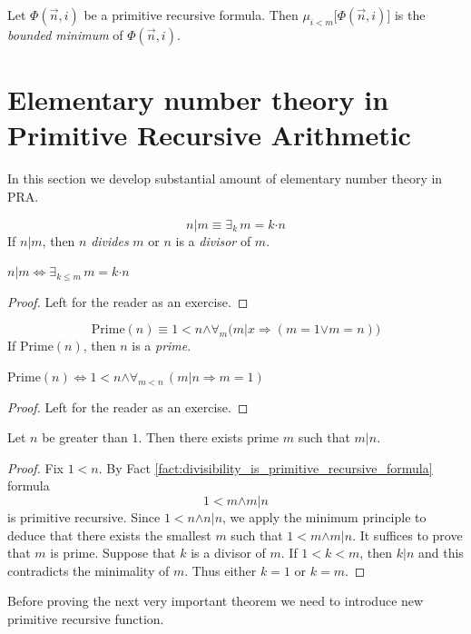 \documentclass[10pt]{amsart}
\newcommand{\mforall}{\boldsymbol{\forall}}
\newcommand{\mexists}{\boldsymbol{\exists}}
\newcommand{\mra}{\boldsymbol{\Rightarrow}}
\newcommand{\mequiv}{\boldsymbol{\Leftrightarrow}}
\newcommand{\mand}{\boldsymbol{\wedge}}
\newcommand{\mor}{\boldsymbol{\vee}}
\newcommand{\mle}{\boldsymbol{<}}
\newcommand{\mleq}{\boldsymbol{\leq}}
\newcommand{\meq}{\boldsymbol{=}}
\newcommand{\mdot}{\boldsymbol{\cdot}}
\begin{document}
\begin{definition}
	Let $\Phi(\vec{n},i)$ be a primitive recursive formula. Then $\mu_{i \mle m}\big[\Phi(\vec{n},i)\big]$ is the \textit{bounded minimum} of $\Phi(\vec{n},i)$.
\end{definition}

\section{Elementary number theory in Primitive Recursive Arithmetic}
\noindent
In this section we develop substantial amount of elementary number theory in $\mathrm{PRA}$.

\begin{definition}
	$$n|m \equiv \mexists_k\,m \meq k\mdot n$$
	If $n|m$, then $n$ \textit{divides} $m$ or $n$ is a \textit{divisor} of $m$.
\end{definition}

\begin{fact}\label{fact:divisibility_is_primitive_recursive_formula}
	$n|m \mequiv \mexists_{k \mleq m}\,m \meq k \mdot n$
\end{fact}
\begin{proof}
	Left for the reader as an exercise.
\end{proof}

\begin{definition}
	$$\mathrm{Prime}(n) \equiv 1 \mle n \mand \mforall_{m}\big(m|x \mra \left(m \meq 1 \mor m \meq n\right)\big)$$
	If $\mathrm{Prime}(n)$, then $n$ is a \textit{prime}.
\end{definition}

\begin{fact}\label{fact:prime_is_primitive_recursive_formula}
	$\mathrm{Prime}(n) \mequiv 1 \mle n \mand \mforall_{m \mle n}\,\left(m|n \mra m \meq 1\right)$
\end{fact}
\begin{proof}
	Left for the reader as an exercise.
\end{proof}

\begin{proposition}\label{proposition:every_nonzero_number_has_prime_divisor}
	Let $n$ be greater than $1$. Then there exists prime $m$ such that $m|n$.
\end{proposition}
\begin{proof}
	Fix $1 \mle n$. By Fact \ref{fact:divisibility_is_primitive_recursive_formula} formula
	$$1 \mle m \mand m|n$$
	is primitive recursive. Since $1 \mle n \mand n|n$, we apply the minimum principle to deduce that there exists the smallest $m$ such that $1 \mle m \mand m|n$. It suffices to prove that $m$ is prime. Suppose that $k$ is a divisor of $m$. If $1 \mle k \mle m$, then $k|n$ and this contradicts the minimality of $m$. Thus either $k \meq 1$ or $k \meq m$.
\end{proof}
\noindent
Before proving the next very important theorem we need to introduce new primitive recursive function.
\end{document}

